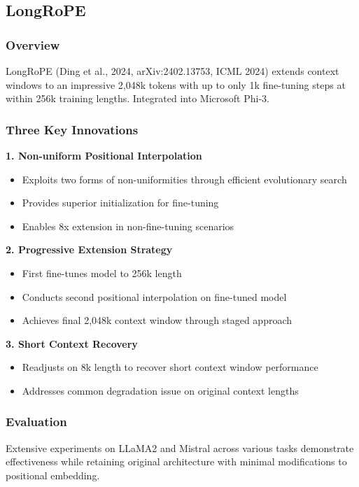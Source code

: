 \documentclass[11pt,letterpaper]{article}
\begin{document}
\subsection{LongRoPE}

\subsubsection{Overview}
LongRoPE (Ding et al., 2024, arXiv:2402.13753, ICML 2024) extends context windows to an impressive 2,048k tokens with up to only 1k fine-tuning steps at within 256k training lengths. Integrated into Microsoft Phi-3.

\subsubsection{Three Key Innovations}

\textbf{1. Non-uniform Positional Interpolation}
\begin{itemize}[leftmargin=*]
    \item Exploits two forms of non-uniformities through efficient evolutionary search
    \item Provides superior initialization for fine-tuning
    \item Enables 8x extension in non-fine-tuning scenarios
\end{itemize}

\textbf{2. Progressive Extension Strategy}
\begin{itemize}[leftmargin=*]
    \item First fine-tunes model to 256k length
    \item Conducts second positional interpolation on fine-tuned model
    \item Achieves final 2,048k context window through staged approach
\end{itemize}

\textbf{3. Short Context Recovery}
\begin{itemize}[leftmargin=*]
    \item Readjusts on 8k length to recover short context window performance
    \item Addresses common degradation issue on original context lengths
\end{itemize}

\subsubsection{Evaluation}
Extensive experiments on LLaMA2 and Mistral across various tasks demonstrate effectiveness while retaining original architecture with minimal modifications to positional embedding.
\end{document}
